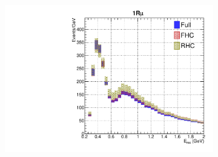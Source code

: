 \begin{figure}[h]
\begin{subfigure}[t]{0.32\textwidth}
		\includegraphics[width=\textwidth, trim={0mm 0mm 0mm 0mm}, clip, page=3]{figures/mach3/data/alt/try_2017_fit_on_sk_spectra_posterior_sk_error_run2to4_spectra_posterior_sk_error_run5to6_spectra}
	\end{subfigure}
	

\end{figure}
